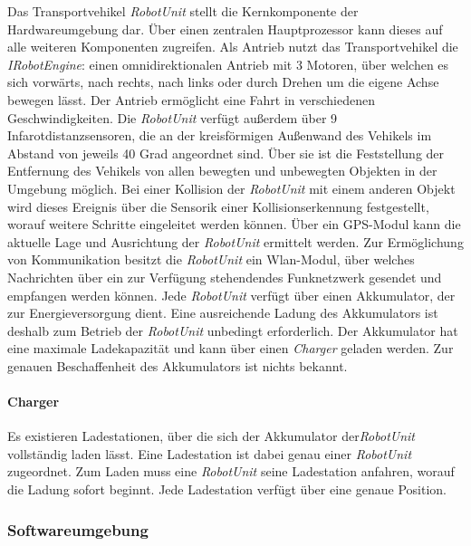   Das Transportvehikel \emph{RobotUnit} stellt die Kernkomponente der Hardwareumgebung dar. Über einen zentralen Hauptprozessor kann dieses auf alle weiteren Komponenten zugreifen. Als Antrieb nutzt das Transportvehikel die \emph{IRobotEngine}: einen omnidirektionalen Antrieb mit 3 Motoren, über welchen es sich vorwärts, nach rechts, nach links oder durch Drehen um die eigene Achse bewegen lässt. Der Antrieb ermöglicht eine Fahrt in verschiedenen Geschwindigkeiten. Die \emph{RobotUnit} verfügt außerdem über 9 Infarotdistanzsensoren, die an der kreisförmigen Außenwand des Vehikels im Abstand von jeweils 40 Grad angeordnet sind. Über sie ist die Feststellung der Entfernung des Vehikels von allen bewegten und unbewegten Objekten in der Umgebung möglich. Bei einer Kollision der \emph{RobotUnit} mit einem anderen Objekt wird dieses Ereignis über die Sensorik einer Kollisionserkennung festgestellt, worauf weitere Schritte eingeleitet werden können. Über ein GPS-Modul kann die aktuelle Lage und Ausrichtung der \emph{RobotUnit} ermittelt werden. Zur Ermöglichung von Kommunikation besitzt die \emph{RobotUnit} ein Wlan-Modul, über welches Nachrichten über ein zur Verfügung stehendendes Funknetzwerk gesendet und empfangen werden können. Jede \emph{RobotUnit} verfügt über einen Akkumulator, der zur Energieversorgung dient. Eine ausreichende Ladung des Akkumulators ist deshalb zum Betrieb der \emph{RobotUnit} unbedingt erforderlich. Der Akkumulator hat eine maximale Ladekapazität und kann über einen \emph{Charger} geladen werden. Zur genauen Beschaffenheit des Akkumulators ist nichts bekannt.

  \paragraph{Charger}\label{charger}

  Es existieren Ladestationen, über die sich der Akkumulator der\emph{RobotUnit} vollständig laden lässt. Eine Ladestation ist dabei genau einer \emph{RobotUnit} zugeordnet. Zum Laden muss eine \emph{RobotUnit} seine Ladestation anfahren, worauf die Ladung sofort beginnt. Jede Ladestation verfügt über eine genaue Position.

    \subsubsection{Softwareumgebung}

